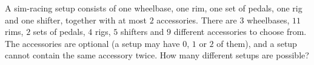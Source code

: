 A sim-racing setup consists of one wheelbase, one rim, one set of pedals, one rig and one shifter, together with at most $2$ accessories. There are $3$ wheelbases, $11$ rims, $2$ sets of pedals, $4$ rigs, $5$ shifters and $9$ different accessories to choose from. The accessories are optional (a setup may have $0$, $1$ or $2$ of them), and a setup cannot contain the same accessory twice. How many different setups are possible?
